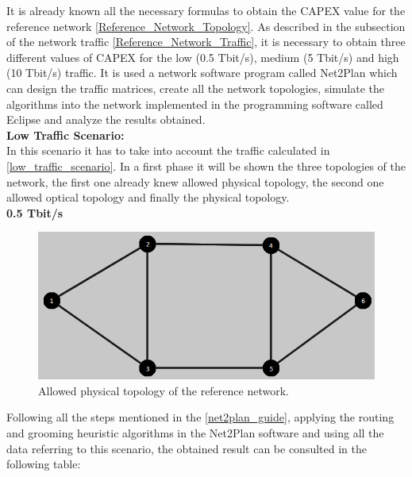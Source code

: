 It is already known all the necessary formulas to obtain the CAPEX value for the reference network \ref{Reference_Network_Topology}. As described in the subsection of the network traffic \ref{Reference_Network_Traffic}, it is necessary to obtain three different values of CAPEX for the low (0.5 Tbit/s), medium (5 Tbit/s) and high (10 Tbit/s) traffic. It is used a network software program called Net2Plan which can design the traffic matrices, create all the network topologies, simulate the algorithms into the network implemented in the programming software called Eclipse and analyze the results obtained.\\

\textbf{Low Traffic Scenario:}\\

In this scenario it has to take into account the traffic calculated in \ref{low_traffic_scenario}. In a first phase it will be shown the three topologies of the network, the first one already knew allowed physical topology, the second one allowed optical topology and finally the physical topology.\\

\textbf{0.5 Tbit/s}

\begin{figure}[H]
\centering
\includegraphics[width=13cm]{sdf/heuristic/figures/topological_design1}
\caption{Allowed physical topology of the reference network.}
\label{allowed_physical_surv_ref_low_heuristic}
\end{figure}

Following all the steps mentioned in the \ref{net2plan_guide}, applying the routing and grooming heuristic algorithms in the Net2Plan software and using all the data referring to this scenario, the obtained result can be consulted in the following table:


